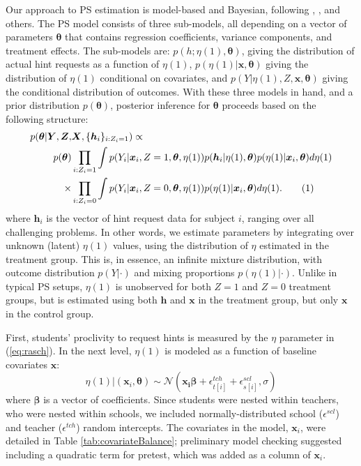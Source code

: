 \documentclass{article}\usepackage[]{graphicx}\usepackage[]{color}
\newcommand\numberthis{\addtocounter{equation}{1}\tag{\theequation}}
\begin{document}
Our approach to PS estimation is model-based and Bayesian, following
\citet{page2012principal}, \citet{feller2016compared},
\citet{schwartz2011bayesian} and others.
The PS model consists of three sub-models, all depending on a
 vector of parameters $\bm{\theta}$ that contains regression
 coefficients, variance components, and treatment effects.
The sub-models are:
$p(h;\eta(1),\bm{\theta})$, giving the distribution of actual hint
requests as a function of $\eta(1)$, $p(\eta(1)|\bm{x},\bm{\theta})$
giving the distribution of $\eta(1)$ conditional on covariates, and
$p(Y|\eta(1),Z,\bm{x},\bm{\theta})$ giving the conditional
distribution of outcomes.
With these three models in hand, and a prior distribution
$p(\bm{\theta})$, posterior inference for $\bm{\theta}$ proceeds based
on the following structure:
\begin{align*}
p(\bm{\theta}|\bm{Y},\bm{Z},&\bm{X},\{\bm{h}_i\}_{i:Z_i=1})\propto\\
p(\bm{\theta})&\displaystyle\prod_{i: Z_i=1}\int p(Y_i|\bm{x}_i,Z=1,\bm{\theta},\eta(1))p(\bm{h}_{i}|\eta(1),\bm{\theta})p(\eta(1)|\bm{x}_i,\bm{\theta})d\eta(1)\\
\times&\displaystyle\prod_{i:Z_i=0} \int p(Y_i|\bm{x}_i,Z=0,\bm{\theta},\eta(1))p(\eta(1)|\bm{x}_i,\bm{\theta})d\eta(1).\numberthis\label{eq:posteriorEta}
\end{align*}
where $\bm{h}_i$ is the vector of hint request data for subject $i$,
ranging over all challenging problems.
In other words, we estimate parameters by integrating over unknown
(latent) $\eta(1)$ values, using the distribution of $\eta$ estimated
in the treatment group.
This is, in essence, an infinite mixture distribution, with outcome
distribution $p(Y|\cdot)$ and mixing proportions $p(\eta(1)|\cdot)$.
Unlike in typical PS setups, $\eta(1)$ is unobserved for both $Z=1$
and $Z=0$ treatment groups, but is estimated using both $\bm{h}$ and
$\bm{x}$ in the treatment group, but only $\bm{x}$ in the control
group.

First, students' proclivity to request hints is measured by the $\eta$
parameter in (\ref{eq:rasch}).
In the next level, $\eta(1)$ is modeled as a function of baseline
covariates $\bm{x}$:
\begin{equation}\label{eq:rasch2}
\eta(1)|\left(\bm{x}_i,\bm{\theta}\right) \sim
\mathcal{N}\left(\bm{x_i}\bm{\beta}+\epsilon^{tch}_{t[i]}+\epsilon^{scl}_{s[i]},
\sigma\right)
\end{equation}
where $\bm{\beta}$ is a vector of coefficients.
Since students were nested within teachers, who were nested within
schools, we included normally-distributed school ($\epsilon^{scl}$) and
teacher ($\epsilon^{tch}$) random intercepts.
The covariates in the model, $\bm{x}_i$, were detailed in Table
\ref{tab:covariateBalance}; preliminary model checking suggested
including a quadratic term for pretest, which was added as a column of
$\bm{x}_i$.
\end{document}
